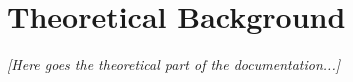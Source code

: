 %
%
%
%


\section{Theoretical Background}
\textit{[Here goes the theoretical part of the documentation...]}

